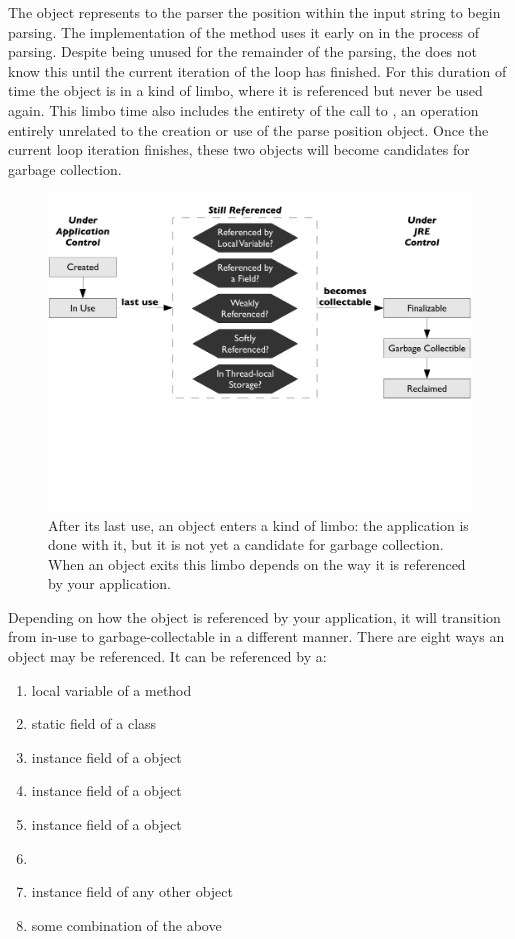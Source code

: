 The  object represents to the parser the position within the input
string to begin parsing. The implementation of the  method uses it
early on in the process of parsing. Despite being unused for the remainder of the
parsing, the \jre does not know this until the current iteration of the loop has
finished. For this duration of time the object is in a kind of limbo, where it is
referenced but never be used again. This limbo time also includes the entirety of
the call to , an operation entirely unrelated to the
creation or use of the parse position object. Once the current loop iteration
finishes, these two objects will become candidates for garbage collection.

\begin{figure}
	\centering
	\includegraphics[width=\textwidth]{part2/Figures/lifetime/states}
	\caption{After its last use, an object enters a kind of limbo: the application
	is done with it, but it is not yet a candidate for garbage collection. When an
	object exits this limbo depends on the way it is referenced by your
	application.}
		\label{fig:limbo-exit}
\end{figure}

Depending on how the object is referenced by your application, it will
transition from in-use to garbage-collectable in a different manner. There are
eight ways an object may be referenced. It can be referenced by a:

\begin{enumerate}
  \item local variable of a method
  \item static field of a class
  \item instance field of a  object
  \item instance field of a  object
  \item instance field of a  object
  \item \tls
  \item instance field of any other object
  \item some combination of the above
\end{enumerate}

